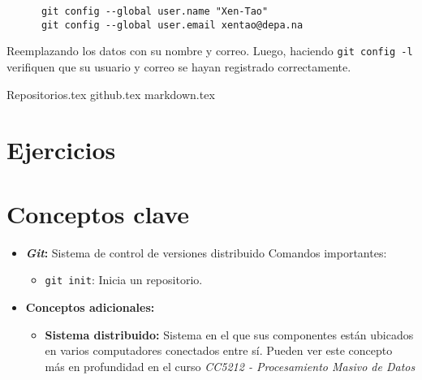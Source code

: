     \begin{verbatim}
      git config --global user.name "Xen-Tao"
      git config --global user.email xentao@depa.na
    \end{verbatim}

    Reemplazando los datos con su nombre y correo.
    Luego, haciendo \texttt{git config -l} verifiquen que su usuario y correo se
    hayan registrado correctamente.

  {Repositorios.tex}
  {github.tex}
  {markdown.tex}

  \section{Ejercicios}
  \section{Conceptos clave}
    \begin{itemize}
      \item \textbf{\textit{Git}:} Sistema de control de versiones distribuido
        Comandos importantes:
        \begin{itemize}
          \item \texttt{git init}: Inicia un repositorio.
        \end{itemize}
      \item \textbf{Conceptos adicionales:}
        \begin{itemize}
          \item \textbf{Sistema distribuido:\label{kw:distr-sist}}
            Sistema en el que sus componentes están ubicados en varios computadores 
            conectados entre sí.
            Pueden ver este concepto más en profundidad en el curso \textit{CC5212 - 
            Procesamiento Masivo de Datos}
        \end{itemize} 
    \end{itemize}
  \nocite{*}
  \printbibliography[keyword=git]
%